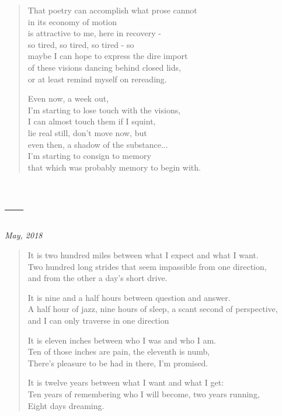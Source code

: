 \begin{verse}
That poetry can accomplish what prose cannot\\
in its economy of motion\\
is attractive to me, here in recovery -\\
\vin so tired, so tired, so tired - so\\
maybe I can hope to express the dire import\\
of these visions dancing behind closed lids,\\
or at least remind myself on rereading.

Even now, a week out,\\
I'm starting to lose touch with the visions,\\
I can almost touch them if I squint,\\
\vin lie real still, don't move now, but\\
even then, a shadow of the substance...\\
I'm starting to consign to memory\\
that which was probably memory to begin with.
\end{verse}

\newpage
\section{---}

\hfill\textit{May, 2018}

\begin{verse}
It is two hundred miles between what I expect and what I want.\\
Two hundred long strides that seem impassible from one direction,\\
\vin and from the other a day's short drive.

It is nine and a half hours between question and answer.\\
A half hour of jazz, nine hours of sleep, a scant second of perspective,\\
\vin and I can only traverse in one direction

It is eleven inches between who I was and who I am.\\
Ten of those inches are pain, the eleventh is numb,\\
\vin There's pleasure to be had in there, I'm promised.

It is twelve years between what I want and what I get:\\
Ten years of remembering who I will become, two years running,\\
\vin Eight days dreaming.
\end{verse}


